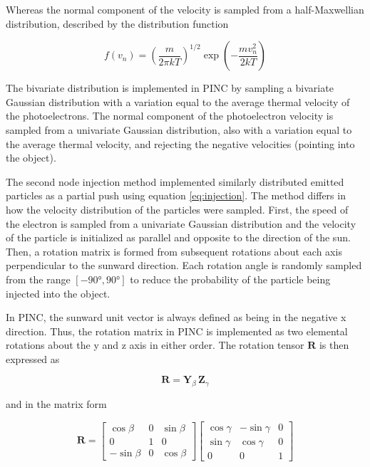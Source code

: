 Whereas the normal component of the velocity is sampled from a half-Maxwellian distribution, described by the distribution function

\begin{equation}\label{eq:halfMaxwell}
    f(v_n) = \left(\frac{m}{2 \pi k T}\right)^{1/2} \exp \left(- \frac{m v^2_n}{2 k T} \right)
\end{equation}

The bivariate distribution is implemented in PINC by sampling a bivariate Gaussian distribution with a variation equal to the average thermal velocity of the photoelectrons. The normal component of the photoelectron velocity is sampled from a univariate Gaussian distribution, also with a variation equal to the average thermal velocity, and rejecting the negative velocities (pointing into the object).

The second node injection method implemented similarly distributed emitted particles as a partial push using equation \eqref{eq:injection}. The method differs in how the velocity distribution of the particles were sampled. First, the speed of the electron is sampled from a univariate Gaussian distribution and the velocity of the particle is initialized as parallel and opposite to the direction of the sun. Then, a rotation matrix is formed from subsequent rotations about each axis perpendicular to the sunward direction. Each rotation angle is randomly sampled from the range $[\ang{-90}, \ang{90}]$ to reduce the probability of the particle being injected into the object.

In PINC, the sunward unit vector is always defined as being in the negative x direction. Thus, the rotation matrix in PINC is implemented as two elemental rotations about the y and z axis in either order. The rotation tensor $\pmb{R}$ is then expressed as

\begin{equation}\label{eq:rotMat}
    \pmb{R} = \pmb{Y}_{\beta} \, \pmb{Z}_{\gamma}
\end{equation}


and in the matrix form


\begin{equation}\label{eq:rotMatFull}
    \pmb{R} = 
        \begin{bmatrix}
            \cos \beta & 0 & \sin \beta \\
            0 & 1 & 0 \\
            -\sin \beta & 0 & \cos \beta
        \end{bmatrix}
        \begin{bmatrix}
            \cos \gamma & -\sin \gamma & 0 \\
            \sin \gamma & \cos \gamma & 0 \\
            0 & 0 & 1
        \end{bmatrix}
\end{equation}


